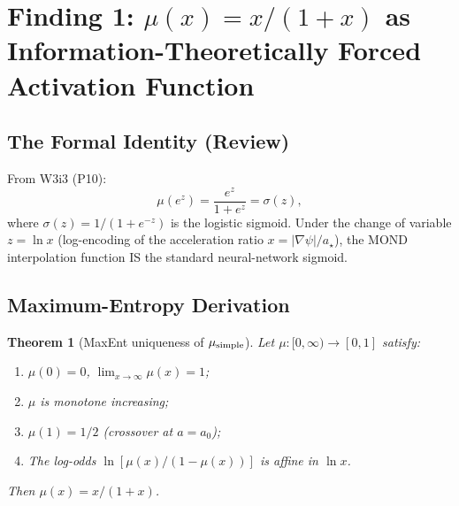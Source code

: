 \documentclass[11pt]{article}
\newtheorem{theorem}{Theorem}[section]
\theoremstyle{definition}
\theoremstyle{remark}
\newcommand{\astar}{a_\star}
\begin{document}
\newpage

\section{Finding 1: $\mu(x) = x/(1+x)$ as Information-Theoretically
  Forced Activation Function}
\label{sec:sigmoid}

\subsection{The Formal Identity (Review)}

From W3i3 (P10):
\begin{equation}
  \mu(e^z) = \frac{e^z}{1 + e^z} = \sigma(z),
  \label{eq:mu-sigma}
\end{equation}
where $\sigma(z) = 1/(1+e^{-z})$ is the logistic sigmoid. Under the
change of variable $z = \ln x$ (log-encoding of the acceleration ratio
$x = |\nabla\psi|/\astar$), the MOND interpolation function IS the
standard neural-network sigmoid.

\subsection{Maximum-Entropy Derivation}

\begin{theorem}[MaxEnt uniqueness of $\mu_{\rm simple}$]
\label{thm:maxent}
Let $\mu: [0,\infty) \to [0,1]$ satisfy:
\begin{enumerate}
  \item[(A1)] $\mu(0) = 0$, $\lim_{x \to \infty} \mu(x) = 1$;
  \item[(A2)] $\mu$ is monotone increasing;
  \item[(A3)] $\mu(1) = 1/2$ (crossover at $a = a_0$);
  \item[(A4)] The log-odds $\ln[\mu(x)/(1-\mu(x))]$ is affine in $\ln x$.
\end{enumerate}
Then $\mu(x) = x/(1+x)$.
\end{theorem}
\end{document}
